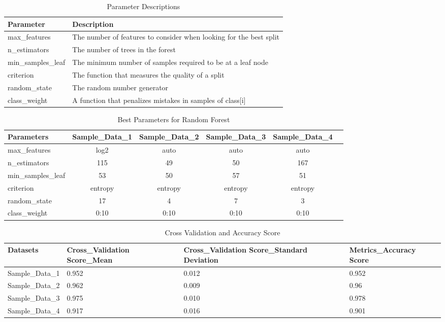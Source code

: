 \documentclass[a4paper, twoside, 12pt]{report}
\begin{document}
\begin{table}[h!]
	\begin{tabular}{ | l | p{13cm} |}
		\hline
		Parameter & Description  \\
		\hline
		max\_features & The number of features to consider when looking for the best split \\ 
		\hline
		n\_estimators & The number of trees in the forest \\ 
		\hline
		min\_samples\_leaf & The minimum number of samples required to be at a leaf node \\
		\hline
		criterion & The function that measures the quality of a split  \\
		\hline
		random\_state & The random number generator \\ 
		\hline
		class\_weight & A function that  penalizes mistakes in samples of class[i] \\ 
		\hline
	\end{tabular}
	\caption{Parameter Descriptions}
	\label{table:1}
\end{table}

\begin{table}[h!]
	\begin{tabular}{l*{4}{c}r}
		Parameters     & Sample\_Data\_1 & Sample\_Data\_2 & Sample\_Data\_3 & Sample\_Data\_4 \\
		\hline
		max\_features & log2 & auto & auto & auto  \\
		n\_estimators & 115 & 49 & 50 & 167  \\
		min\_samples\_leaf & 53 & 50 & 57 & 51  \\
		criterion & entropy & entropy & entropy & entropy  \\
		random\_state & 17 & 4 & 7 & 3  \\
		class\_weight & {0:10} & {0:10} & {0:10} & {0:10}  \\
		
	\end{tabular}
	\caption{Best Parameters for Random Forest}
	\label{table:1}
\end{table}

\begin{table}[h!]
	\centering
	\begin{tabular}{ |p{3cm}||p{3cm}|p{3cm}|p{3cm}|  }
		
		\hline
		Datasets & Cross\_Validation
		Score\_Mean    & Cross\_Validation
		Score\_Standard Deviation
		& Metrics\_Accuracy
		Score\\
		\hline
		Sample\_Data\_1 & 0.952    &0.012 & 0.952\\
		\hline
		Sample\_Data\_2 & 0.962    &0.009 & 0.96\\
		\hline
		Sample\_Data\_3 & 0.975    &0.010 & 0.978\\
		\hline
		Sample\_Data\_4 & 0.917    &0.016 & 0.901\\
		\hline
	\end{tabular}
	\caption{Cross Validation and Accuracy Score}
	\label{table:1}
\end{table}
\end{document}
